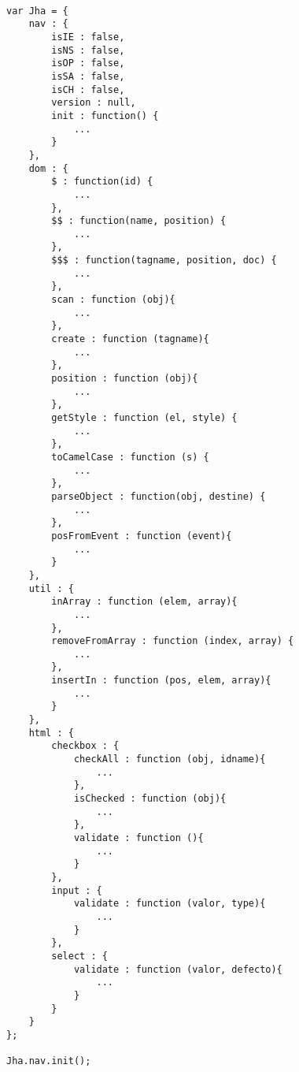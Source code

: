 \begin{lstlisting}[label=js_jha,caption=Objeto JSON Jha. ]

var Jha = {
	nav : {
		isIE : false,
		isNS : false,
		isOP : false,
		isSA : false,
		isCH : false,
		version : null,
		init : function() {
			...
		}
	},
	dom : {
		$ : function(id) {
			...
		},
		$$ : function(name, position) {
			...
		},
		$$$ : function(tagname, position, doc) {
			...
		},
		scan : function (obj){
			...
		},
		create : function (tagname){
			...
		},
		position : function (obj){
			...
		},
		getStyle : function (el, style) {
			...
		},
		toCamelCase : function (s) {
		    ...
 		},
		parseObject : function(obj, destine) {
	        ...
		},
		posFromEvent : function (event){
			...
		}
	},
	util : {
		inArray : function (elem, array){
			...
		},
		removeFromArray : function (index, array) {
			...
		},
		insertIn : function (pos, elem, array){
			...
		}
	},
	html : {
		checkbox : {
			checkAll : function (obj, idname){
				...
			},
			isChecked : function (obj){
				...
			},
			validate : function (){
				...
			}
		},
		input : {
			validate : function (valor, type){
				...
			}
		},
		select : {
			validate : function (valor, defecto){
				...
			}
		}
	}
};

Jha.nav.init();
\end{lstlisting}
